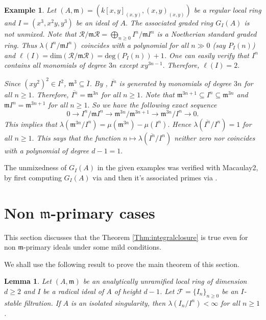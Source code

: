 \documentclass[11pt]{amsart}
\theoremstyle{plain}
\newtheorem{lemma}[theorem]{Lemma}
\newtheorem{example}[theorem]{Example}
\newcommand{\m}{\mathfrak{m}}
\newcommand{\R}{\mathcal{R}}
\newcommand{\F}{\mathcal{F}}
\theoremstyle{plain}
\begin{document}
\begin{example}\label{exam}
    \normalfont
     Let $(A,\m)=(k[x,y]_{(x,y)}, (x,y)_{(x,y)})$ be a regular local ring and $I=(x^3,x^2y,y^3)$ be an ideal of $A.$ The associated graded ring $G_I(A)$ is not unmixed. Note that $\R/\m \R=\bigoplus_{n\geq 0}I^n/\m I^n$ is a Noetherian standard graded ring. Thus $\lambda(I^n/\m I^n)$ coincides with a polynomial for all $n\gg0$ (say $P_I(n)$) and $\ell(I)=\text{dim}(\R/\m \R)=\text{deg}(P_I(n))+1$. One can easily verify that $I^n$ contains all monomials of degree $3n$ except $xy^{3n-1}.$ Therefore, $\ell(I)=2.$

      Since $(xy^2)^2\in I^2$, $\m^3\subseteq \overline{I}$. By \cite[Corollary 12.1.6]{Monomial}, $\overline{I^n}$ is generated by monomials of degree $3n$ for all $n\geq 1$. Therefore, $\overline{I^n}=\m^{3n}$ for all $n\geq 1$. Note that $\m^{3n+1}\subseteq I^n \subseteq \m^{3n}$ and $\m I^n=\m^{3n+1}$ for all $n\geq 1.$ So we have the following exact sequence $$0\to I^n/\m I^n\to \m^{3n}/\m^{3n+1}\to \m^{3n}/I^n\to 0.$$ This implies that $\lambda(\m^{3n}/I^n)=\mu(\m^{3n})-\mu(I^n).$ Hence $\lambda(\overline{I^n}/I^n)=1$ for all $n\geq 1.$ This says that the function $n\mapsto \lambda(\overline{I^n}/I^n)$ neither zero nor coincides with a polynomial of degree $d-1=1.$
\end{example}
The unmixedness of $G_I(A)$ in the given examples was
verified with Macaulay2, by first computing $G_I(A)$ via   and then it's associated primes via  .





\section{Non \texorpdfstring{$\m$-}-primary cases}
This section discusses that the Theorem \ref{Thm:integralclosure} is true even for non $\m$-primary ideals under some mild conditions.

We shall use the following result to prove the main theorem of this section.

\begin{lemma}\label{Length}
    Let $(A,\m)$ be an analytically unramified local ring of dimension $d\geq 2$ and $I$ be a radical ideal of $A$ of height $d-1$. Let $\F=\{I_n\}_{n\geq 0}$ be an $I$-stable filtration. If $A$ is an isolated singularity, then $\lambda(I_n/I^n)<\infty$ for all $n\geq 1$.
\end{lemma}
\end{document}
